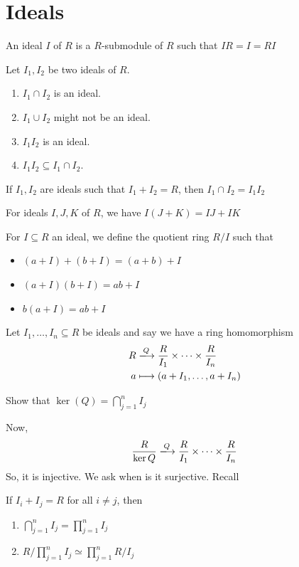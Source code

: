 \documentclass[oneside, 12pt]{scrbook}
\newcommand{\ds}{\displaystyle}
\theoremstyle{theorem}
\begin{document}
\chapter{Ideals}

An ideal $I$ of $R$ is a $R$-submodule of $R$ such that $IR = I = RI$

\begin{proposition}
Let $I_{1},I_{2}$ be two ideals of $R$.
\begin{enumerate}
\item $I_{1} \cap I_{2}$ is an ideal. 
\item $I_{1}\cup I_{2}$ might not be an ideal. 
\item $I_{1}I_{2}$ is an ideal. 
\item $I_{1}I_{2} \subseteq I_{1} \cap I_{2}$.
\end{enumerate}
\end{proposition}

\begin{exercise}
If $I_{1},I_{2}$ are ideals such that $I_{1} + I_{2} = R$, then $I_{1}\cap I_{2} = I_{1}I_{2}$
\end{exercise}

\begin{lemma}
For ideals $I,J,K$ of $R$, we have $I(J+K) = IJ + IK$
\end{lemma}

For $I \subseteq R$ an ideal, we define the quotient ring $R/I$ such that 
\begin{itemize}
\item $(a+I) + (b+I) = (a+b) + I$
\item $(a+I)(b+I) = ab + I$
\item $b(a+I) = ab + I$
\end{itemize}

Let $I_{1}, \hdots ,I_{n} \subseteq R$ be ideals and say we have a ring homomorphism 
\begin{eqnarray*}
R &\xlongrightarrow{Q} \frac{R}{I_{1}} \times \cdots \times \frac{R}{I_{n}}\\
a &\longmapsto (a+ I_{1}, \hdots , a+I_{n})
\end{eqnarray*}

\begin{exercise}
Show that $\ker(Q) = \bigcap_{j=1}^n I_{j}$
\end{exercise}

Now, 
\begin{equation}
\frac{R}{\ker Q} \xlongrightarrow{Q} \frac{R}{I_{1}} \times \cdots \times \frac{R}{I_{n}}
\end{equation}
So, it is injective. We ask when is it surjective. Recall
\begin{theorem}
If $I_{i} + I_{j} = R$ for all $i \neq j$, then 
\begin{enumerate}
\item $\ds{\bigcap_{j=1}^n I_{j} = \prod_{j=1}^n I_{j}}$
\item $\ds{R/\prod_{j=1}^n I_{j}  \simeq \prod_{j=1}^n R/I_{j}}$
\end{enumerate}
\end{theorem}
\end{document}
